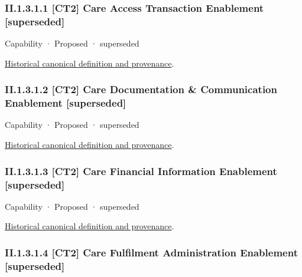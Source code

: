 \subsubsection*{II.1.3.1.1 [CT2] Care Access Transaction Enablement [superseded]}
\label{navigation:II.1.3.1.1}

\label{element:b65973b576154d3a96cf458bf33df53a}
{\small Capability · Proposed · superseded}\par
\href{../../../../continuum/strategy/capability/b65973b576154d3a96cf458bf33df53a.md}{Historical canonical definition and provenance}.\par
\subsubsection*{II.1.3.1.2 [CT2] Care Documentation \& Communication Enablement [superseded]}
\label{navigation:II.1.3.1.2}

\label{element:5ad2e381ec484d1d9062a65eee842fa7}
{\small Capability · Proposed · superseded}\par
\href{../../../../continuum/strategy/capability/5ad2e381ec484d1d9062a65eee842fa7.md}{Historical canonical definition and provenance}.\par
\subsubsection*{II.1.3.1.3 [CT2] Care Financial Information Enablement [superseded]}
\label{navigation:II.1.3.1.3}

\label{element:59a756b89c604e3e97ee5dede2d6ed89}
{\small Capability · Proposed · superseded}\par
\href{../../../../continuum/strategy/capability/59a756b89c604e3e97ee5dede2d6ed89.md}{Historical canonical definition and provenance}.\par
\subsubsection*{II.1.3.1.4 [CT2] Care Fulfilment Administration Enablement [superseded]}
\label{navigation:II.1.3.1.4}

